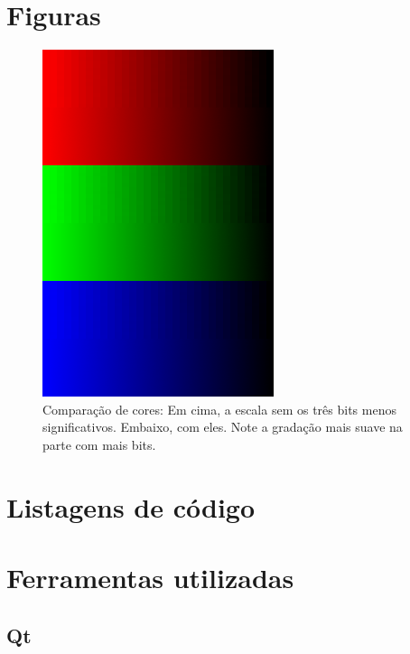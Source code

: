 \documentclass[brazil]{abnt}
\begin{document}




\anexo

\chapter{Figuras}

\begin{figure}[h]
\centering
\includegraphics{imgs/diferenca_cor.png}
\caption[Comparação de cores]{Comparação de cores: Em cima, a escala sem os três bits menos significativos. Embaixo, com eles. Note a gradação mais suave na parte com mais bits.}
\label{img:comparacao} 
\end{figure}

\chapter{Listagens de código}





\chapter{Ferramentas utilizadas}

\section{Qt}
\label{ferramentas-qt}
\end{document}
